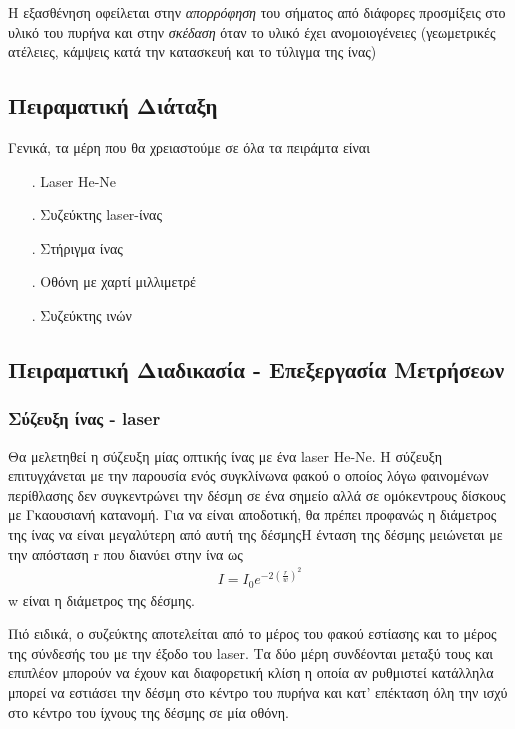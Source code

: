\documentclass[a4paper]{article}
\begin{document}
		Η εξασθένηση οφείλεται στην \textit{απορρόφηση} του σήματος από διάφορες προσμίξεις στο υλικό του πυρήνα και στην  \textit{σκέδαση} όταν το υλικό έχει ανομοιογένειες (γεωμετρικές ατέλειες, κάμψεις κατά την κατασκευή και το τύλιγμα της ίνας)
\subsection*{Πειραματική Διάταξη}
Γενικά, τα μέρη που θα χρειαστούμε σε όλα τα πειράμτα είναι 
	\begin{itemize}
		\item[.] Laser He-Ne 
		\item[.] Συζεύκτης laser-ίνας
		\item[.] Στήριγμα ίνας 
		\item[.] Οθόνη με χαρτί μιλλιμετρέ
		\item[.] Συζεύκτης ινών
	\end{itemize}
\subsection*{Πειραματική Διαδικασία - Επεξεργασία Μετρήσεων}

	\subsubsection*{Σύζευξη ίνας - laser}
		Θα μελετηθεί η σύζευξη μίας οπτικής ίνας με ένα laser He-Ne. Η σύζευξη επιτυγχάνεται με την παρουσία ενός συγκλίνωνα φακού ο οποίος λόγω φαινομένων περίθλασης δεν συγκεντρώνει την δέσμη σε ένα σημείο αλλά σε ομόκεντρους δίσκους  με Γκαουσιανή κατανομή. Για να είναι αποδοτική, θα πρέπει προφανώς η διάμετρος της ίνας να είναι μεγαλύτερη από αυτή της δέσμηςΗ ένταση της δέσμης μειώνεται με την απόσταση r που διανύει στην ίνα ως 
		\begin{align*}
			I = I_0 e^{-2 (\frac{r}{w})^2}
		\end{align*}
		w είναι η διάμετρος της δέσμης.
		
		Πιό ειδικά, ο συζεύκτης αποτελείται από το μέρος του φακού εστίασης και το μέρος της σύνδεσής του με την έξοδο του laser. Τα δύο μέρη συνδέονται μεταξύ τους και επιπλέον μπορούν να έχουν και διαφορετική κλίση η οποία αν ρυθμιστεί κατάλληλα μπορεί να εστιάσει την δέσμη στο κέντρο του πυρήνα και κατ' επέκταση όλη την ισχύ στο κέντρο του ίχνους της δέσμης σε μία οθόνη.
		
\end{document}
